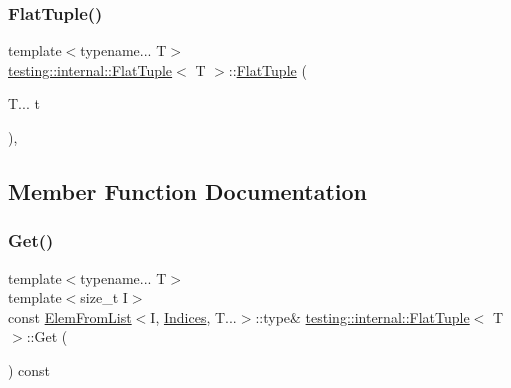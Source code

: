 \subsubsection{\texorpdfstring{Flat\+Tuple()}{FlatTuple()}\hspace{0.1cm}{\footnotesize\ttfamily [2/2]}}
{\footnotesize\ttfamily template$<$typename... T$>$ \\
\hyperlink{classtesting_1_1internal_1_1FlatTuple}{testing\+::internal\+::\+Flat\+Tuple}$<$ T $>$\+::\hyperlink{classtesting_1_1internal_1_1FlatTuple}{Flat\+Tuple} (\begin{DoxyParamCaption}\item[{T...}]{t }\end{DoxyParamCaption})\hspace{0.3cm}{\ttfamily [inline]}, {\ttfamily [explicit]}}



\subsection{Member Function Documentation}
\mbox{\label{classtesting_1_1internal_1_1FlatTuple_a9ea6508fa6413ceca5e38b8077c67938}} 
\subsubsection{\texorpdfstring{Get()}{Get()}\hspace{0.1cm}{\footnotesize\ttfamily [1/2]}}
{\footnotesize\ttfamily template$<$typename... T$>$ \\
template$<$size\+\_\+t I$>$ \\
const \hyperlink{structtesting_1_1internal_1_1ElemFromList}{Elem\+From\+List}$<$I, \hyperlink{classtesting_1_1internal_1_1FlatTuple_a004b42fc11ac1a85a9b1560fa83cdf77}{Indices}, T...$>$\+::type\& \hyperlink{classtesting_1_1internal_1_1FlatTuple}{testing\+::internal\+::\+Flat\+Tuple}$<$ T $>$\+::Get (\begin{DoxyParamCaption}{ }\end{DoxyParamCaption}) const\hspace{0.3cm}{\ttfamily [inline]}}

\mbox{\label{classtesting_1_1internal_1_1FlatTuple_a48a13560f8963f727d81a7922e3b3e50}} 
